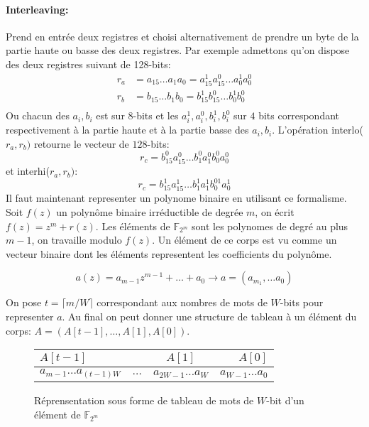 \documentclass[12pt]{article}
\begin{document}
\paragraph{Interleaving:} Prend en entrée deux registres et choisi alternativement de prendre un byte de la partie haute ou basse des deux registres. Par exemple admettons qu'on dispose des deux registres suivant de 128-bits:
\begin{align*}
    r_a &= a_{15}\ldots a_{1}a_{0} = a_{15}^{1}a_{15}^{0}\ldots a_{0}^1a_{0}^0\\
    r_b &= b_{15}\ldots b_{1}b_{0} = b_{15}^{1}b_{15}^{0}\ldots b_{0}^1b_{0}^0\\
\end{align*}
Ou chacun des $a_i, b_i$ est sur $8$-bits et les $a_i^{1}, a_i^0, b_i^{1}, b_i^0$ sur $4$ bits correspondant respectivement à la partie haute et à la partie basse des $a_i, b_i$.
\newline
L'opération interlo($r_a, r_b)$ retourne le vecteur de $128$-bits:
$$ r_c = b_{15}^{0} a_{15}^{0}\ldots b_{1}^0a_{1}^0b_{0}^0a_{0}^0$$
et interhi($r_a, r_b)$:
$$ r_c = b_{15}^{1} a_{15}^{1} \ldots b_{1}^1a_{1}^1b_{0}^01a_{0}^1$$
\medskip
Il faut maintenant representer un polynome binaire en utilisant ce formalisme. Soit $f(z)$ un polynôme binaire irréductible de degrée $m$, on écrit $f(z) = z^m + r(z)$. Les éléments de $\mathbb{F}_{2^m}$ sont les polynomes de degré au plus $m-1$, on travaille modulo $f(z)$. Un élément de ce corps est vu comme un vecteur binaire dont les éléments representent les coefficients du polynôme.

$$ a(z) = a_{m-1}z^{m-1} + \ldots + a_0 \longrightarrow a = (a_{m_1}, \ldots a_0) $$

On pose $t= \lceil m / W \rceil$ correspondant aux nombres de mots de $W$-bits pour representer $a$. Au final on peut donner une structure de tableau à un élément du corps: $A= (A[t-1],\ldots ,A[1],A[0])$.

\vspace{1cm}
\begin{figure}[h!]
    \begin{center}

\begin{tabular}{|l|c|c|r|}
\hline
$A[t-1]$ & & $A[1]$ & $A[0]$  \\
\hline
$a_{m-1}\ldots a_{(t-1)W}$ & $\ldots$ & $a_{2W-1}\ldots a_{W}$& $a_{W-1}\ldots a_{0}$     \\
  \hline
\end{tabular}

  \caption{Réprensentation sous forme de tableau de mots de $W$-bit d'un élément de $\mathbb{F}_{2^m}$}

    \label{field element as an array}
    \end{center}
\end{figure}
\end{document}
